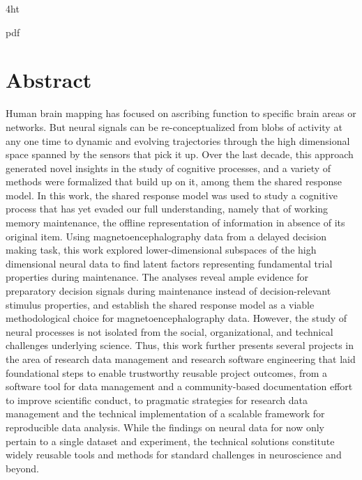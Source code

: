 \documentclass[
  a4paper,  %
  twoside,  %
  bibliography=totoc,
  headsepline,
  cleardoublepage=empty,
  parskip=half,
  draft=false
]{scrbook}
\begin{document}
\iftex4ht
  \Configure{$}{\PicMath}{\EndPicMath}{}

  {pdf}
  {%
  }
\fi



\Titelblatt

\pagestyle{preamble}
\renewcommand*{\chapterpagestyle}{preamble}



\section*{Abstract}

Human brain mapping has focused on ascribing function to specific brain areas or networks.
But neural signals can be re-conceptualized from blobs of activity at any one time to dynamic and evolving trajectories through the high dimensional space spanned by the sensors that pick it up.
Over the last decade, this approach generated novel insights in the study of cognitive processes, and a variety of methods were formalized that build up on it, among them the shared response model.
In this work, the shared response model was used to study a cognitive process that has yet evaded our full understanding, namely that of working memory maintenance, the offline representation of information in absence of its original item.
Using magnetoencephalography data from a delayed decision making task, this work explored lower-dimensional subspaces of the high dimensional neural data to find latent factors representing fundamental trial properties during maintenance.
The analyses reveal ample evidence for preparatory decision signals during maintenance instead of decision-relevant stimulus properties, and establish the shared response model as a viable methodological choice for magnetoencephalography data.
However, the study of neural processes is not isolated from the social, organizational, and technical challenges underlying science.
Thus, this work further presents several projects in the area of research data management and research software engineering that laid foundational steps to enable trustworthy reusable project outcomes, from a software tool for data management and a community-based documentation effort to improve scientific conduct, to pragmatic strategies for research data management and the technical implementation of a scalable framework for reproducible data analysis.
While the findings on neural data for now only pertain to a single dataset and experiment, the technical solutions constitute widely reusable tools and methods for standard challenges in neuroscience and beyond.
\end{document}
